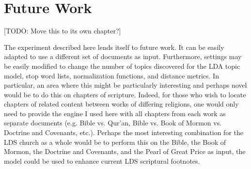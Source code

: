\section{Future Work}

[TODO: Move this to its own chapter?]

The experiment described here lends itself to future work. It can be easily adapted to use a different set of documents as input. Furthermore, settings may be easily modified to change the number of topics discovered for the LDA topic model, stop word lists, normalization functions, and distance metrics. In particular, an area where this might be particularly interesting and perhaps novel would be to do this on chapters of scripture. Indeed, for those who wish to locate chapters of related content between works of differing religions, one would only need to provide the engine I used here with all chapters from each work as separate documents (e.g. Bible vs. Qur'an, Bible vs. Book of Mormon vs. Doctrine and Covenants, etc.). Perhaps the most interesting combination for the LDS church as a whole would be to perform this on the Bible, the Book of Mormon, the Doctrine and Covenants, and the Pearl of Great Price as input, the model could be used to enhance current LDS scriptural footnotes.
